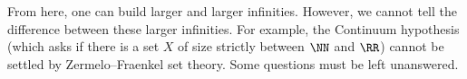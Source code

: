 \begin{remark}
	From here, one can build larger and larger infinities. However, we cannot tell the difference between these larger infinities. For example, the Continuum hypothesis (which asks if there is a set $X$ of size strictly between $\NN$ and $\RR$) cannot be settled by Zermelo--Fraenkel set theory. Some questions must be left unanswered.
\end{remark}